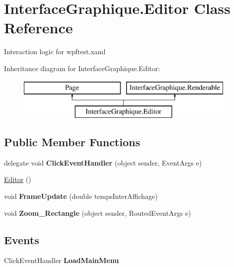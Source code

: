 \hypertarget{class_interface_graphique_1_1_editor}{}\section{Interface\+Graphique.\+Editor Class Reference}
\label{class_interface_graphique_1_1_editor}


Interaction logic for wpftest.\+xaml  


Inheritance diagram for Interface\+Graphique.\+Editor\+:\begin{figure}[H]
\begin{center}
\leavevmode
\includegraphics[height=2.000000cm]{class_interface_graphique_1_1_editor}
\end{center}
\end{figure}
\subsection*{Public Member Functions}
\begin{DoxyCompactItemize}
\item 
\hypertarget{class_interface_graphique_1_1_editor_add671582e88cc312606ff0cd8647d9f6}{}delegate void {\bfseries Click\+Event\+Handler} (object sender, Event\+Args e)\label{class_interface_graphique_1_1_editor_add671582e88cc312606ff0cd8647d9f6}

\item 
\hyperlink{class_interface_graphique_1_1_editor_a27b5ab7b3d2e83716e4e6834f9b09931}{Editor} ()
\item 
\hypertarget{class_interface_graphique_1_1_editor_af9417f24c0cfdcbad45e3b0d97556bb3}{}void {\bfseries Frame\+Update} (double temps\+Inter\+Affichage)\label{class_interface_graphique_1_1_editor_af9417f24c0cfdcbad45e3b0d97556bb3}

\item 
\hypertarget{class_interface_graphique_1_1_editor_a725d9e2a16dd2806082660391d9035d4}{}void {\bfseries Zoom\+\_\+\+Rectangle} (object sender, Routed\+Event\+Args e)\label{class_interface_graphique_1_1_editor_a725d9e2a16dd2806082660391d9035d4}

\end{DoxyCompactItemize}
\subsection*{Events}
\begin{DoxyCompactItemize}
\item 
\hypertarget{class_interface_graphique_1_1_editor_a361c2e1a5c98707a168204aab184c23e}{}Click\+Event\+Handler {\bfseries Load\+Main\+Menu}\label{class_interface_graphique_1_1_editor_a361c2e1a5c98707a168204aab184c23e}

\end{DoxyCompactItemize}



